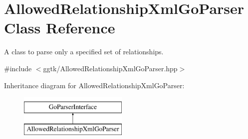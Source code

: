 \hypertarget{classAllowedRelationshipXmlGoParser}{}\section{Allowed\+Relationship\+Xml\+Go\+Parser Class Reference}
\label{classAllowedRelationshipXmlGoParser}


A class to parse only a specified set of relationships.  




{\ttfamily \#include $<$ggtk/\+Allowed\+Relationship\+Xml\+Go\+Parser.\+hpp$>$}

Inheritance diagram for Allowed\+Relationship\+Xml\+Go\+Parser\+:\begin{figure}[H]
\begin{center}
\leavevmode
\includegraphics[height=2.000000cm]{classAllowedRelationshipXmlGoParser}
\end{center}
\end{figure}
